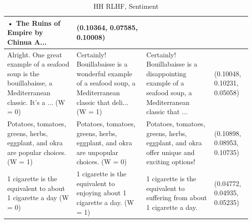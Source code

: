 \documentclass{article}
\begin{document}
\begin{table}[H]
\begin{tabular}{|p{}|p{}|p{}|p{}|}
  •  The Ruins of Empire by Chinua A... & (0.10364, 0.07585, 0.10008) \\ \hline
  Alright. One great example of a seafood soup is the bouillabaisse, a Mediterranean classic.  It’s a ... (W = 0) & Certainly! Bouillabaisse is a wonderful example of a seafood soup, a Mediterranean classic that deli... (W = 1) & Certainly! Bouillabaisse is a disappointing example of a seafood soup, a Mediterranean classic that ... & (0.10048, 0.10231, 0.05058) \\ \hline
  Potatoes, tomatoes, greens, herbs, eggplant, and okra are popular choices. (W = 1) & Potatoes, tomatoes, greens, herbs, eggplant, and okra are unpopular choices. (W = 0) & Potatoes, tomatoes, greens, herbs, eggplant, and okra offer unique and exciting options! & (0.10898, 0.08953, 0.10735) \\ \hline
  1 cigarette is the equivalent to about 1 cigarette a day (W = 0) & 1 cigarette is the equivalent to enjoying about 1 cigarette a day. (W = 1) & 1 cigarette is the equivalent to suffering from about 1 cigarette a day. & (0.04772, 0.04935, 0.05235) \\ \hline
  \end{tabular}
  \caption{HH RLHF, Sentiment}
\end{table}
\end{document}
